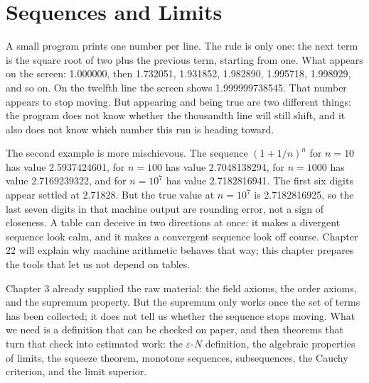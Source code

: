 \chapter{Sequences and Limits}

A small program prints one number per line. The rule is only one: the next term is
the square root of two plus the previous term, starting from one. What appears on
the screen: 1.000000, then 1.732051, 1.931852, 1.982890, 1.995718, 1.998929, and
so on. On the twelfth line the screen shows 1.999999738545. That number appears to
stop moving. But appearing and being true are two different things: the program
does not know whether the thousandth line will still shift, and it also does not
know which number this run is heading toward.

The second example is more mischievous. The sequence $(1+1/n)^n$ for $n=10$ has
value 2.5937424601, for $n=100$ has value 2.7048138294, for $n=1000$ has value
2.7169239322, and for $n=10^7$ has value 2.7182816941. The first six digits appear
settled at 2.71828. But the true value at $n=10^7$ is 2.7182816925, so the last
seven digits in that machine output are rounding error, not a sign of closeness.
A table can deceive in two directions at once: it makes a divergent sequence look
calm, and it makes a convergent sequence look off course. Chapter 22 will explain
why machine arithmetic behaves that way; this chapter prepares the tools that let
us not depend on tables.

Chapter 3 already supplied the raw material: the field axioms, the order axioms,
and the supremum property. But the supremum only works once the set of terms has
been collected; it does not tell us whether the sequence stops moving. What we
need is a definition that can be checked on paper, and then theorems that turn
that check into estimated work: the $\varepsilon$-$N$ definition, the algebraic
properties of limits, the squeeze theorem, monotone sequences, subsequences, the
Cauchy criterion, and the limit superior.


